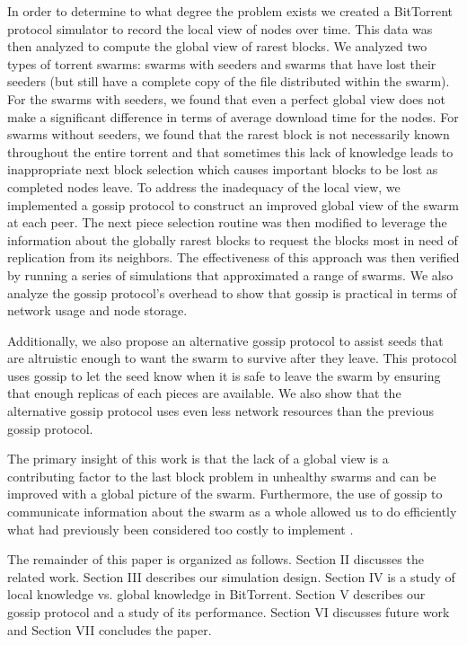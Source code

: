 In order to determine to what degree the problem exists we created a
BitTorrent protocol simulator to record the local view of nodes over
time. This data was then analyzed to compute the global view of rarest
blocks. We analyzed two types of torrent swarms: swarms with seeders and
swarms that have lost their seeders (but still have a complete copy of
the file distributed within the swarm). For the swarms with seeders,
we found that even a perfect global view does not make a significant
difference in terms of average download time for the nodes. For swarms
without seeders, we found that the rarest block is not necessarily
known throughout the entire torrent and that sometimes this lack of
knowledge leads to inappropriate next block selection which causes
important blocks to be lost as completed nodes leave. To address the
inadequacy of the local view, we implemented a gossip protocol to
construct an improved global view of the swarm at each peer.  The next
piece selection routine was then modified to leverage the information
about the globally rarest blocks to request the blocks most in need of
replication from its neighbors. The effectiveness of this approach was
then verified by running a series of simulations that approximated a
range of swarms. We also analyze the gossip protocol's overhead to show
that gossip is practical in terms of network usage and node storage.

Additionally, we also propose an alternative gossip protocol to assist
seeds that are altruistic enough to want the swarm to survive after they
leave. This protocol uses gossip to let the seed know when it is safe
to leave the swarm by ensuring that enough replicas of each pieces are
available. We also show that the alternative gossip protocol uses even
less network resources than the previous gossip protocol.


The primary insight of this work is that the lack of a global view is
a contributing factor to the last block problem in unhealthy swarms
and can be improved with a global picture of the swarm.  Furthermore,
the use of gossip to communicate information about the swarm as a whole
allowed us to do efficiently what had previously been considered too
costly to implement \cite{cohen:1}.


The remainder of this paper is organized as follows. Section II discusses
the related work. Section III describes our simulation design.  Section IV
is a study of local knowledge vs. global knowledge in BitTorrent.  Section
V describes our gossip protocol and a study of its performance. Section
VI discusses future work and Section VII concludes the paper.
